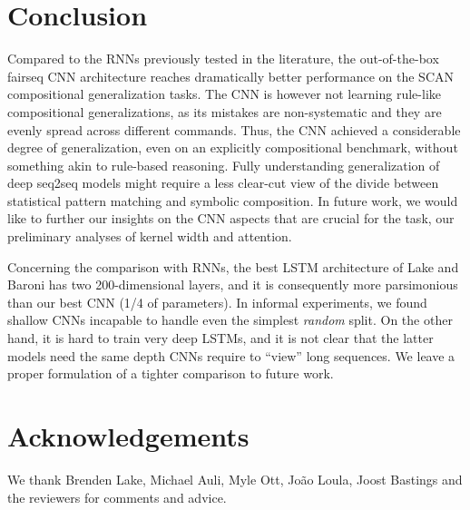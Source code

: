 \section{Conclusion}

Compared to the RNNs previously tested in the
literature, the out-of-the-box fairseq CNN architecture reaches
dramatically better performance on the SCAN compositional
generalization tasks. The CNN
is however not  learning rule-like compositional generalizations, as its
mistakes are non-systematic and they are evenly spread across different
commands. Thus, the CNN  achieved a considerable
degree of generalization, even on an explicitly compositional
benchmark, without something akin to rule-based reasoning. Fully
understanding generalization of deep seq2seq models might require a less
clear-cut view of the divide between statistical pattern matching and
symbolic composition. In future work, we would like to further our insights on the
CNN aspects that are crucial for the task,  our preliminary
analyses of kernel width and attention.

Concerning the comparison with RNNs, the best LSTM architecture of
Lake and Baroni has two 200-dimensional layers, and it is consequently
more parsimonious than our best CNN (1/4 of parameters). In informal
experiments, we found shallow CNNs incapable to handle even the
simplest \emph{random} split. On the other hand, it is hard to train
very deep LSTMs, and it is not clear that the latter models need the
same depth CNNs require to ``view'' long sequences. We
leave a proper formulation of a tighter comparison to future work.

\section*{Acknowledgements}
We thank Brenden Lake, Michael Auli, Myle Ott, Jo\~ao Loula, Joost Bastings and the reviewers for comments and advice.
